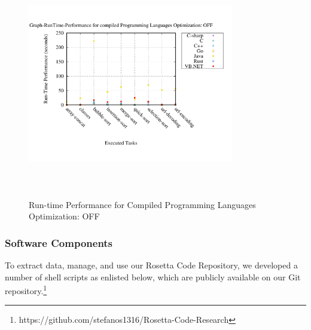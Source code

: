 \begin{figure}
	\centering
	\includegraphics[width=9cm,height=10cm,keepaspectratio]{"Graph_Graph-RunTime-Performance_compiled_Optimization_OFF"}
	\caption{ Run-time Performance for Compiled Programming Languages Optimization: OFF}
	\label{Performance Compiled with No Optimization Total}
\end{figure}

\subsubsection{Software Components} \label{software_components}
To extract data, manage, and use our Rosetta Code Repository, 
we developed a number of shell scripts as enlisted below, which are 
publicly available on our Git repository.\footnote{https://github.com/stefanos1316/Rosetta-Code-Research} 

